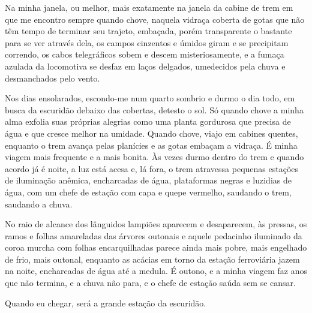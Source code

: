 Na minha janela, ou melhor, mais exatamente na janela da cabine de trem
em que me encontro sempre quando chove, naquela vidraça coberta de gotas
que não têm tempo de terminar seu trajeto, embaçada, porém transparente
o bastante para se ver através dela, os campos cinzentos e úmidos giram
e se precipitam correndo, os cabos telegráficos sobem e descem
misteriosamente, e a fumaça azulada da locomotiva se desfaz em laços
delgados, umedecidos pela chuva e desmanchados pelo vento.

Nos dias ensolarados, escondo-me num quarto sombrio e durmo o dia todo,
em busca da escuridão debaixo das cobertas, detesto o sol. Só quando
chove a minha alma exfolia suas próprias alegrias como uma planta
gordurosa que precisa de água e que cresce melhor na umidade. Quando
chove, viajo em cabines quentes, enquanto o trem avança pelas planícies
e as gotas embaçam a vidraça. É minha viagem mais frequente e a mais
bonita. Às vezes durmo dentro do trem e quando acordo já é noite, a luz
está acesa e, lá fora, o trem atravessa pequenas estações de iluminação
anêmica, encharcadas de água, plataformas negras e luzidias de água, com
um chefe de estação com capa e quepe vermelho, saudando o trem, saudando
a chuva.

No raio de alcance dos lânguidos lampiões aparecem e desaparecem, às
pressas, os ramos e folhas amareladas das árvores outonais e aquele
pedacinho iluminado da coroa murcha com folhas encarquilhadas parece
ainda mais pobre, mais engelhado de frio, mais outonal, enquanto as
acácias em torno da estação ferroviária jazem na noite, encharcadas de
água até a medula. É outono, e a minha viagem faz anos que não termina,
e a chuva não para, e o chefe de estação saúda sem se cansar.

Quando eu chegar, será a grande estação da escuridão.



